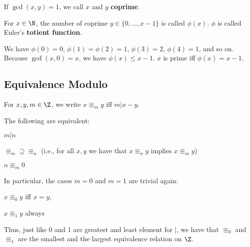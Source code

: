 \begin{definition}
If $\gcd(x,y)=1$, we call $x$ and $y$ \textbf{coprime}.

For $x\in\N$, the number of coprime $y\in\{0,\ldots,x-1\}$ is called $\phi(x)$.
$\phi$ is called Euler's \textbf{totient function}.
\end{definition}

We have $\phi(0)=0$, $\phi(1)=\phi(2)=1$, $\phi(3)=2$, $\phi(4)=1$, and so on.
Because $\gcd(x,0)=x$, we have $\phi(x)\leq x-1$.
$x$ is prime iff $\phi(x)=x-1$.

\subsection{Equivalence Modulo}\label{sec:math:modulo}

\begin{definition}\label{def:math:modulo}
 For $x,y,m\in\Z$, we write $x\Equiv_m y$ iff $m|x-y$.
\end{definition}

\begin{theorem}
The following are equivalent:
\begin{compactitem}
\item $m|n$
\item $\Equiv_m\supseteq \Equiv_n$ (i.e., for all $x,y$ we have that $x\Equiv_n y$ implies $x\Equiv_m y$)
\item $n\Equiv_m 0$
\end{compactitem}
\end{theorem}

\begin{remark}
In particular, the cases $m=0$ and $m=1$ are trivial again:
\begin{compactitem}
\item $x\Equiv_0 y$ iff $x=y$,
\item $x\Equiv_1 y$ always
\end{compactitem}

Thus, just like $0$ and $1$ are greatest and least element for $|$, we have that $\Equiv_0$ and $\Equiv_1$ are the smallest and the largest equivalence relation on $\Z$.
\end{remark}


